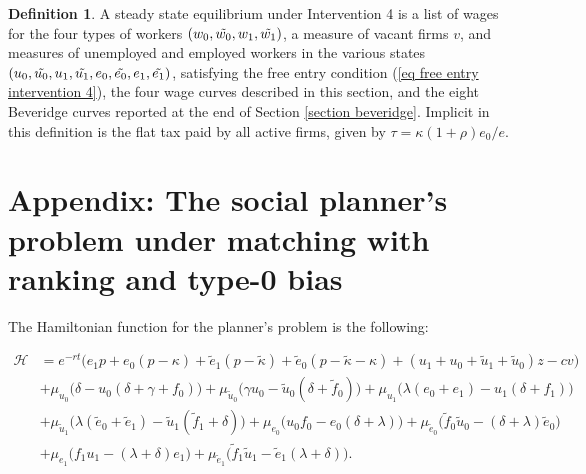 \documentclass[12pt]{article} %
\theoremstyle{definition}
\newtheorem{definition}{Definition}%
\begin{document}
\begin{appendix}
\medskip

\begin{definition}\label{definition equilibrium}
	A steady state equilibrium under Intervention 4 is a list of wages for the four types of workers $(w_0, \Tilde{w_0}, w_1, \Tilde{w_1})$, a measure of vacant firms $v$, and measures of unemployed and employed workers in the various states $(u_0, \Tilde{u_0}, u_1, \Tilde{u_1}, e_0, \Tilde{e_0}, e_1, \Tilde{e_1})$, satisfying the free entry condition (\ref{eq free entry intervention 4}), the four wage curves described in this section, and the eight Beveridge curves reported at the end of Section \ref{section beveridge}. Implicit in this definition is the flat tax paid by all active firms, given by $\tau = \kappa(1+\rho)e_0/e$. 
\end{definition} 


\section{Appendix: The social planner's problem under matching with ranking and type-0 bias \label{section appendix SSPP}}
 \noindent The Hamiltonian function for the planner's problem is the following:
\begin{fleqn}
\begin{equation*}
\begin{split}
\mathcal{H} & = e^{-rt}\bigl(e_1p + e_0(p-\kappa) + \tilde{e}_1(p-\tilde{\kappa}) + \tilde{e}_0(p-\tilde{\kappa}-\kappa) + (u_1+u_0+\tilde{u}_1+\tilde{u}_0)z -cv\bigr)   \\
&+ \mu_{u_0}\bigl(\delta - u_0(\delta+\gamma+f_0)\bigr) +\mu_{\tilde{u}_0} \bigl(\gamma u_0 -\tilde{u}_0(\delta+\tilde{f}_0)\bigr) + \mu_{u_1}\bigl(\lambda(e_0+e_1)-u_1(\delta+f_1)\bigr) \\
&+ \mu_{\tilde{u}_1}\bigl(\lambda(\tilde{e}_0+\tilde{e}_1) -\tilde{u}_1(\tilde{f}_1+\delta)\bigr) + \mu_{e_0}\bigl(u_0f_0-e_0(\delta+\lambda)\bigr) + \mu_{\tilde{e}_0}\bigl(\tilde{f}_0\tilde{u}_0-(\delta+\lambda)\tilde{e}_0\bigr)  \\
&+ \mu_{e_1}\bigl(f_1u_1-(\lambda+\delta)e_1\bigr) + \mu_{\tilde{e}_1}\bigl(\tilde{f}_1\tilde{u}_1-\tilde{e}_1(\lambda+\delta)\bigr).
\end{split}
\end{equation*}
\end{fleqn}
\medskip


\end{appendix}
\end{document}
